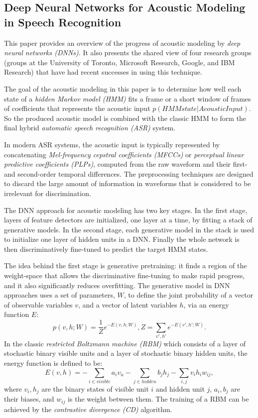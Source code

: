 \documentclass[paper=a4, fontsize=18pt]{article} %
\numberwithin{equation}{section} %
\numberwithin{figure}{section} %
\numberwithin{table}{section} %
\begin{document}
\subsection{Deep Neural Networks for Acoustic Modeling in Speech Recognition \cite{Hinton2012Deep}}

This paper provides an overview of the progress of acoustic modeling by \emph{deep neural networks (DNNs)}. It also presents the shared view of four research groups (groups at the University of Toronto, Microsoft Research, Google, and IBM Research) that have had recent successes in using this technique.

The goal of the acoustic modeling in this paper is to determine how well each state of a \emph{hidden Markov model (HMM)} fits a frame or a short window of frames of coefficients that represents the acoustic input $p(HMMstate | AcousticInput)$. So the produced acoustic model is combined with the classic HMM to form the final hybrid \emph{automatic speech recognition (ASR)} system.

In modern ASR systems, the acoustic input is typically represented by concatenating \emph{Mel-frequency cepstral coefficients (MFCCs)} or \emph{perceptual linear predictive coefficients (PLPs)}, computed from the raw waveform and their first- and second-order temporal differences. The preprocessing techniques are designed to discard the large amount of information in waveforms that is considered to be irrelevant for discrimination.

The DNN approach for acoustic modeling has two key stages. In the first stage, layers of feature detectors are initialized, one layer at a time, by fitting a stack of generative models. In the second stage, each generative model in the stack is used to initialize one layer of hidden units in a DNN. Finally the whole network is then discriminatively fine-tuned to predict the target HMM states.

The idea behind the first stage is generative pretraining: it finds a region of the weight-space that allows the discriminative fine-tuning to make rapid progress, and it also significantly reduces overfitting. The generative model in DNN approaches uses a set of parameters, $W$, to define the joint probability of a vector of observable variables $v$, and a vector of latent variables $h$, via an energy function $E$:
$$p(v,h; W) = \frac{1}{Z} e^{-E(v,h; W)}, Z = \sum_{v', h'} e^{-E(v', h'; W)}.$$
In the classic \emph{restricted Boltzmann machine (RBM)} which consists of a layer of stochastic binary visible units and a layer of stochastic binary hidden units, the energy function is defined to be:
$$E(v,h) = -\sum_{i \in  visible} a_i v_u - \sum_{j \in hidden} b_j h_j - \sum_{i,j} v_i h_i w_{ij},$$
where $v_i, h_j$ are the binary states of visible unit $i$ and hidden unit $j$, $a_i, b_j$ are their biases, and $w_{ij}$ is the weight between them. The training of a RBM can be achieved by the \emph{contrastive divergence (CD)} algorithm.
\end{document}
